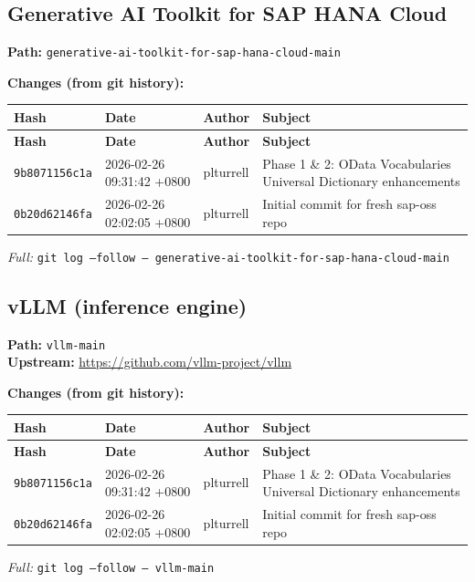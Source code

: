 \documentclass[11pt,a4paper]{article}
\begin{document}
\subsection{Generative AI Toolkit for SAP HANA Cloud}
\textbf{Path:} \texttt{generative-ai-toolkit-for-sap-hana-cloud-main}

\textbf{Changes (from git history):}
\begin{longtable}{|p{2.2cm}|p{3.2cm}|l|p{6cm}|}
\hline \textbf{Hash} & \textbf{Date} & \textbf{Author} & \textbf{Subject} \\ \hline \endfirsthead
\hline \textbf{Hash} & \textbf{Date} & \textbf{Author} & \textbf{Subject} \\ \hline \endhead
\texttt{9b8071156c1a} & 2026-02-26 09:31:42 +0800 & plturrell & Phase 1 \& 2: OData Vocabularies Universal Dictionary enhancements \\
\texttt{0b20d62146fa} & 2026-02-26 02:02:05 +0800 & plturrell & Initial commit for fresh sap-oss repo \\
\hline
\end{longtable}
\textit{Full:} \texttt{git log --follow -- generative-ai-toolkit-for-sap-hana-cloud-main}

\subsection{vLLM (inference engine)}
\textbf{Path:} \texttt{vllm-main}
\\ \textbf{Upstream:} \url{https://github.com/vllm-project/vllm}

\textbf{Changes (from git history):}
\begin{longtable}{|p{2.2cm}|p{3.2cm}|l|p{6cm}|}
\hline \textbf{Hash} & \textbf{Date} & \textbf{Author} & \textbf{Subject} \\ \hline \endfirsthead
\hline \textbf{Hash} & \textbf{Date} & \textbf{Author} & \textbf{Subject} \\ \hline \endhead
\texttt{9b8071156c1a} & 2026-02-26 09:31:42 +0800 & plturrell & Phase 1 \& 2: OData Vocabularies Universal Dictionary enhancements \\
\texttt{0b20d62146fa} & 2026-02-26 02:02:05 +0800 & plturrell & Initial commit for fresh sap-oss repo \\
\hline
\end{longtable}
\textit{Full:} \texttt{git log --follow -- vllm-main}
\end{document}
